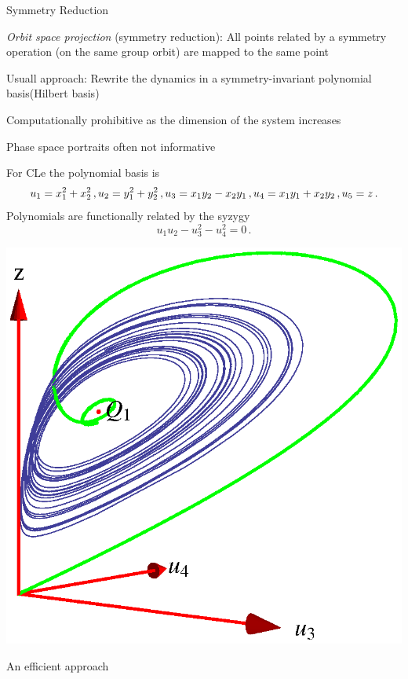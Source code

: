\documentclass{theo1poster}[2003/04/25]
\renewcommand{\labelitemi}{\ding{228}}
\renewenvironment{itemize}%
 {\begin{list}{\labelitemi}%
       {%
        \setlength{\leftmargin}{0pt}%
        \setlength{\itemindent}{0pt}%
        \settowidth{\labelwidth}{\labelitemi}%
        \addtolength{\labelsep}{\itemindent}
        \addtolength{\leftmargin}{\labelwidth}%
        \addtolength{\leftmargin}{\labelsep}%
        \addtolength{\leftmargin}{-\itemindent}%
       }%
 }
 {\end{list}}
\begin{document}
\begin{poster}{3}
\begin{sheet}{Symmetry Reduction}
\large
\begin{itemize}
 \item  \emph{Orbit space projection} (symmetry reduction): All points related by a symmetry
	operation (on the same group orbit) are mapped to the same point
 \item Usuall approach: Rewrite the dynamics in a symmetry-invariant polynomial basis(Hilbert basis)
	\begin{itemize}
 		\item Computationally prohibitive as the dimension of the system increases
		\item Phase space portraits often not informative
		\item For CLe the polynomial basis is
		\[
			u_1 = x_1^2+x_2^2 \,, \\
			u_2 = y_1^2+y_2^2 \,, \\
			u_3 = x_1 y_2-x_2 y_1\,, \\
			u_4 = x_1 y_1+x_2 y_2\,, \\
			u_5 = z\,.
		\]
	Polynomials are functionally related by the syzygy
	\[
 		u_1u_2 -u_3^2-u_4^2 =0\,.
	\]
	\end{itemize}
\end{itemize}

	\includegraphics[width=.38\textwidth]{../../figs/CLEip1.eps}


\end{sheet}


\begin{sheet}{An efficient approach}
 
\end{sheet}





\end{poster}
\end{document}
